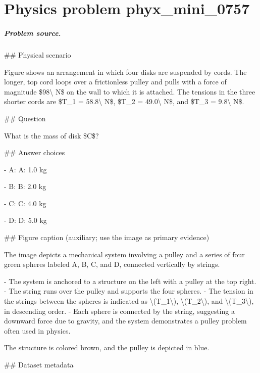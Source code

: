 
\chapter{Physics problem phyx\_mini\_0757}
\label{ch:PhyXMiniProblems_problem_phyx_mini_0757}

\paragraph{Problem source.}
\#\# Physical scenario

Figure shows an arrangement in which four disks are suspended by cords. The longer, top cord loops over a frictionless pulley and pulls with a force of magnitude \$98\textbackslash{} N\$ on the wall to which it is attached. The tensions in the three shorter cords are \$T\_1 = 58.8\textbackslash{} N\$, \$T\_2 = 49.0\textbackslash{} N\$, and \$T\_3 = 9.8\textbackslash{} N\$.

\#\# Question

What is the mass of disk \$C\$?

\#\# Answer choices

- A: A: 1.0 kg

- B: B: 2.0 kg

- C: C: 4.0 kg

- D: D: 5.0 kg

\#\# Figure caption (auxiliary; use the image as primary evidence)

The image depicts a mechanical system involving a pulley and a series of four green spheres labeled A, B, C, and D, connected vertically by strings. 

- The system is anchored to a structure on the left with a pulley at the top right.
- The string runs over the pulley and supports the four spheres.
- The tension in the strings between the spheres is indicated as \textbackslash{}(T\_1\textbackslash{}), \textbackslash{}(T\_2\textbackslash{}), and \textbackslash{}(T\_3\textbackslash{}), in descending order.
- Each sphere is connected by the string, suggesting a downward force due to gravity, and the system demonstrates a pulley problem often used in physics.
  
The structure is colored brown, and the pulley is depicted in blue.

\#\# Dataset metadata

